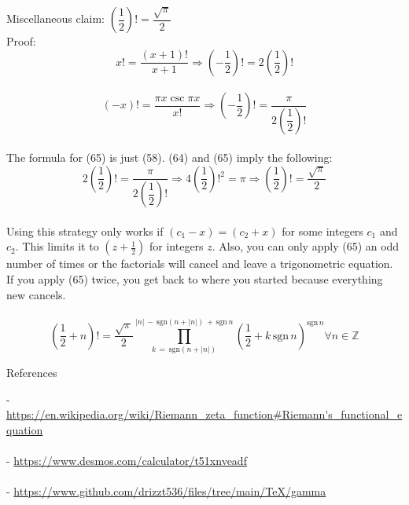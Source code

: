 \documentclass[12pt]{article}
\begin{document}
\begin{section}{Miscellaneous}
	\noindent claim: $\left(\dfrac12\right)!=\dfrac{\sqrt\pi}2$\\
	Proof:\\
	\begin{equation}
		x!=\dfrac{(x+1)!}{x+1}\Longrightarrow\left(-\dfrac12\right)!=2\left(\dfrac12\right)!
	\end{equation}\\
	\begin{equation}
		(-x)!=\dfrac{\pi x\csc\pi x}{x!}\Longrightarrow\left(-\dfrac12\right)!=\dfrac\pi{2\left(\dfrac12\right)!}
	\end{equation}\\
	The formula for (65) is just (58). (64) and (65) imply the following:\\
	\begin{equation}
		2\left(\dfrac12\right)!=\dfrac\pi{2\left(\dfrac12\right)!}\Longrightarrow4\left(\dfrac12\right)!^2=\pi\Longrightarrow\left(\dfrac12\right)!=\dfrac{\sqrt\pi}2
	\end{equation}\\
	Using this strategy only works if $(c_1-x)=(c_2+x)$ for some integers $c_1$ and $c_2$. This limits it to $(z+\frac12)$ for integers $z$. Also, you can only apply (65) an odd number of times or the factorials will cancel and leave a trigonometric equation. If you apply (65) twice, you get back to where you started because everything new cancels.\\
	\blacksquare\\

	\noindent\begin{equation}
		\left(\dfrac12+n\right)!=\dfrac{\sqrt\pi}2\prod_{k\,=\,\text{sgn}\left(n+\left|n\right|\right)}^{\left|n\right|\,-\,\text{sgn}\left(n+\left|n\right|\right)\,+\,\text{sgn}\,n}\left(\dfrac12+k\,\text{sgn}\,n\right)^{\text{sgn}\,n}\forall n\in\mathbb Z
	\end{equation}
\end{section}

\pagebreak\begin{section}{References}

	\noindent- \url{https://en.wikipedia.org/wiki/Riemann\_zeta\_function\#Riemann's\_functional\_equation}\\
	\indent{}\\

	\noindent- \url{https://www.desmos.com/calculator/t51xnveadf}\\
	\indent{}\\

	\noindent- \url{https://www.github.com/drizzt536/files/tree/main/TeX/gamma}\\
	\indent{}
\end{section}
\end{document}
